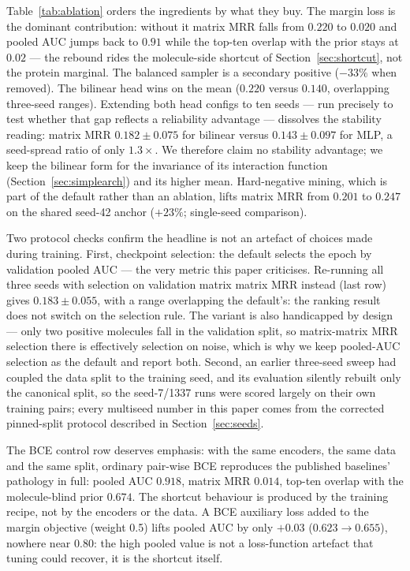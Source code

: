 \documentclass[11pt,a4paper]{article}
\newcommand{\mrr}{matrix MRR}
\begin{document}
Table~\ref{tab:ablation} orders the ingredients by what they buy. The margin
loss is the dominant contribution: without it \mrr{} falls from $0.220$ to
$0.020$ and pooled AUC jumps back to $0.91$ while the top-ten overlap with
the prior stays at $0.02$ --- the rebound rides the molecule-side shortcut
of Section~\ref{sec:shortcut}, not the protein marginal. The balanced sampler is a secondary positive
($-33\%$ when removed). The bilinear head wins on the mean ($0.220$
versus $0.140$, overlapping three-seed ranges). Extending both head configs
to ten seeds --- run precisely to test whether that gap reflects a
reliability advantage --- dissolves the stability reading: \mrr{}
$0.182\pm0.075$ for bilinear versus $0.143\pm0.097$ for MLP, a seed-spread
ratio of only $1.3\times$. We therefore claim no stability advantage; we
keep the bilinear form for the invariance of its interaction function
(Section~\ref{sec:simplearch}) and its higher mean.
Hard-negative mining, which is part of the
default rather than an ablation, lifts \mrr{} from $0.201$ to $0.247$ on the
shared seed-42 anchor ($+23\%$; single-seed comparison).

Two protocol checks confirm the headline is not an artefact of choices made
during training. First, checkpoint selection: the default selects the epoch
by validation pooled AUC --- the very metric this paper criticises. Re-running
all three seeds with selection on validation matrix \mrr{} instead (last row)
gives $0.183 \pm 0.055$, with a range overlapping the default's: the ranking
result does not switch on the selection rule. The variant is also
handicapped by design --- only two positive molecules fall in the
validation split, so matrix-\mrr{} selection there is effectively selection
on noise, which is why we keep pooled-AUC selection as the default and
report both. Second,
an earlier three-seed sweep had coupled the data split to the training seed,
and its evaluation silently rebuilt only the canonical split, so the
seed-7/1337 runs were scored largely on their own training pairs; every
multiseed number in this paper comes from the corrected pinned-split protocol
described in Section~\ref{sec:seeds}.

The BCE control row deserves emphasis: with the same encoders, the same
data and the same split, ordinary pair-wise BCE reproduces the published
baselines' pathology in full: pooled AUC $0.918$, \mrr{} $0.014$, top-ten
overlap with the molecule-blind prior $0.674$. The shortcut behaviour is
produced by the training recipe, not by the encoders or the data. A BCE
auxiliary loss added to the margin objective (weight 0.5) lifts pooled AUC
by only $+0.03$ ($0.623 \to 0.655$), nowhere near $0.80$: the high pooled
value is not a loss-function artefact that tuning could recover, it is the
shortcut itself.
\end{document}
